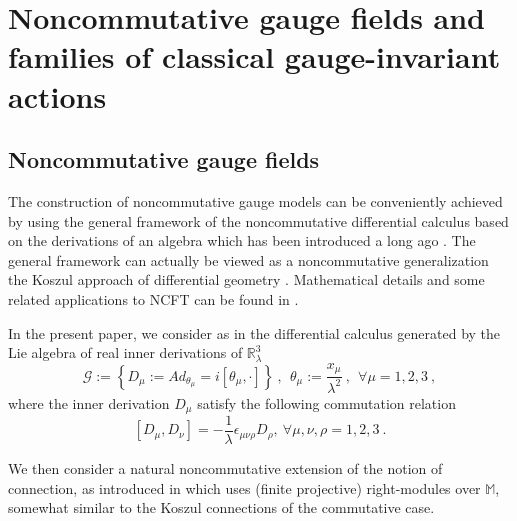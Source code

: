 \documentclass[11pt]{book}
\newcommand{\Mbb}{\mathbb{M}}
\theoremstyle{break}
\begin{document}
\section*{Noncommutative gauge fields and families of classical gauge-invariant actions}


\subsection*{Noncommutative gauge fields}


The construction of noncommutative gauge models can be conveniently achieved by using the general framework of the noncommutative differential calculus based on the derivations of an algebra which has been introduced a long ago \cite{dubois_violette_lectures_1999}. The general framework can actually be viewed as a noncommutative generalization the Koszul approach of differential geometry \cite{koszul_lectures_1960}. Mathematical details and some related applications to NCFT can be found in \cite{wallet_derivations_2009}. \par 






In the present paper, we consider as in \cite{gere_quantum_2014} the differential calculus generated by the Lie algebra of real inner derivations of $\mathbb{R}^3_\lambda$%
%
\begin{equation*}
\mathcal{G} := \left\{D_\mu:= Ad_{\theta_\mu}= i \left[\theta_\mu, \cdot\right]\right\} \ ,  \ \ \theta_\mu := \frac{x_\mu}{\lambda^2} \ , \ \ \forall \mu = 1,2,3 \ , 
\end{equation*}
%
where the inner derivation $D_\mu$ satisfy the following commutation relation%
%
\begin{equation*}
\left[D_\mu,D_\nu\right] = -\frac{1}{\lambda} \epsilon_{\mu\nu\rho} D_\rho,\ \forall \mu,\nu,\rho = 1,2,3 \ . 
\end{equation*}
%


We then consider a natural noncommutative extension of the notion of connection, as introduced in \cite{dubois_violette_lectures_1999} which uses (finite projective) right-modules over $\Mbb$, somewhat similar to the Koszul connections of the commutative case. 
\end{document}
